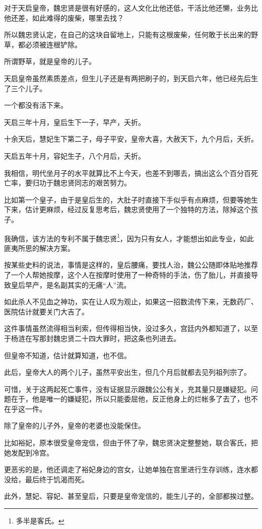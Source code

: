 \begin{multicols}{\theparacolNo}
对于天启皇帝，魏忠贤是很有好感的，这人文化比他还低，干活比他还懒，业务比他还差，如此难得的废柴，哪里去找？

所以魏忠贤认定，在自己的这块自留地上，只能有这根废柴，任何敢于长出来的野草，都必须被连根铲除。

所谓野草，就是皇帝的儿子。

天启皇帝虽然素质差点，但生儿子还是有两把刷子的，到天启六年，他已经先后生了三个儿子。

一个都没有活下来。

天启三年十月，皇后生下一子，早产，夭折。

十余天后，慧妃生下第二子，母子平安，皇帝大喜，大赦天下，九个月后，夭折。

天启五年十月，容妃生子，八个月后，夭折。

我相信，明代坐月子的水平就算比不上今天，也差不到哪去，搞出这么个百分百死亡率，要归功于魏忠贤同志的艰苦努力。

比如第一个皇子，由于是皇后生的，大肚子时直接下手似乎有点麻烦，但要等她生下来，估计更麻烦，经过反复思考后，魏忠贤使用了一个独特的方法，除掉这个孩子。

我确信，该方法的专利不属于魏忠贤\footnote{多半是客氏。}，因为只有女人，才能想出如此专业，如此匪夷所思的解决方案。

按某些史料的说法，事情是这样的，皇后腰痛，要找人治，魏公公随即体贴地推荐了一个人帮她按摩，这个人在按摩时使用了一种奇特的手法，伤了胎儿，并直接导致皇后早产，是名副其实的无痛“人”流。

如此杀人不见血之神功，实在让人叹为观止，如果这一招数流传下来，无数药厂、医院估计就要关门大吉了。

这件事情虽然流得相当利索，但传得相当快，没过多久，宫廷内外都知道了，以至于杨涟在写那封魏忠贤二十四大罪时，把这条也列进去。

但皇帝不知道，估计就算知道，也不信。

此后，皇帝大人的两个儿子，虽然平安出生，但几个月后就都去见列祖列宗了。

可惜，关于这两起死亡事件，没有证据显示跟魏公公有关，充其量只是嫌疑犯。问题在于，他是唯一的嫌疑犯，所以只能委屈他，反正他身上的烂帐多了去了，也不在乎这一件。

除了皇帝的儿子外，皇帝的老婆也没能保住。

比如裕妃，原本很受皇帝宠信，但由于怀了孕，魏忠贤决定整整她，联合客氏，把她发配到冷宫。

更恶劣的是，他还调走了裕妃身边的宫女，让她单独在宫里进行生存训练，连水都没给，最后终于饥渴而死。

此外，慧妃、容妃、甚至皇后，只要是皇帝宠信的，能生儿子的，全部都挨过整。


\end{multicols}
